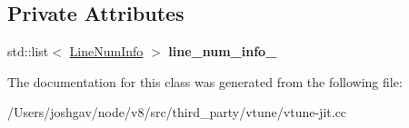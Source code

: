 \subsection*{Private Attributes}
\begin{DoxyCompactItemize}
\item 
std\+::list$<$ \hyperlink{structv_tune_1_1internal_1_1_j_i_t_code_line_info_1_1_line_num_info}{Line\+Num\+Info} $>$ {\bfseries line\+\_\+num\+\_\+info\+\_\+}\hypertarget{classv_tune_1_1internal_1_1_j_i_t_code_line_info_ad573c30843c4a7bd55e124b4205a05fe}{}\label{classv_tune_1_1internal_1_1_j_i_t_code_line_info_ad573c30843c4a7bd55e124b4205a05fe}

\end{DoxyCompactItemize}


The documentation for this class was generated from the following file\+:\begin{DoxyCompactItemize}
\item 
/\+Users/joshgav/node/v8/src/third\+\_\+party/vtune/vtune-\/jit.\+cc\end{DoxyCompactItemize}
